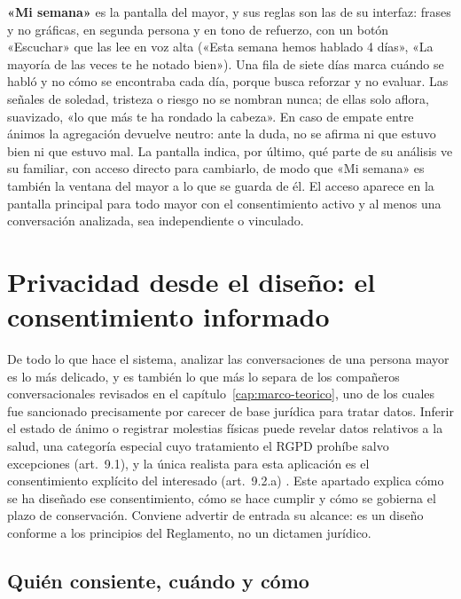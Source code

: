 \textbf{«Mi semana»} es la pantalla del mayor, y sus reglas son las de su interfaz: frases y no gráficas, en
segunda persona y en tono de refuerzo, con un botón «Escuchar» que las lee en voz alta («Esta semana hemos
hablado 4 días», «La mayoría de las veces te he notado bien»). Una fila de siete días marca cuándo se
habló y no cómo se encontraba cada día, porque busca reforzar y no evaluar. Las señales de soledad, tristeza
o riesgo no se nombran nunca; de ellas solo aflora, suavizado, «lo que más te ha rondado la cabeza». En caso
de empate entre ánimos la agregación devuelve neutro: ante la duda, no se afirma ni que estuvo bien ni que
estuvo mal. La pantalla indica, por último, qué parte de su análisis ve su familiar, con acceso directo para
cambiarlo, de modo que «Mi semana» es también la ventana del mayor a lo que se guarda de él. El acceso aparece
en la pantalla principal para todo mayor con el consentimiento activo y al menos una conversación analizada,
sea independiente o vinculado.

\section{Privacidad desde el diseño: el consentimiento informado}
\label{sec:privacidad}

De todo lo que hace el sistema, analizar las conversaciones de una persona mayor es lo más delicado, y es
también lo que más lo separa de los compañeros conversacionales revisados en el
capítulo~\ref{cap:marco-teorico}, uno de los cuales fue sancionado precisamente por carecer de base jurídica
para tratar datos. Inferir el estado de ánimo o registrar molestias físicas puede revelar datos relativos a
la salud, una categoría especial cuyo tratamiento el RGPD prohíbe salvo excepciones (art.~9.1), y la única
realista para esta aplicación es el consentimiento explícito del interesado (art.~9.2.a)
\citep{RGPD2016}. Este apartado explica cómo se ha diseñado ese consentimiento, cómo se hace cumplir y cómo
se gobierna el plazo de conservación. Conviene advertir de entrada su alcance: es un diseño conforme a los
principios del Reglamento, no un dictamen jurídico.

\subsection{Quién consiente, cuándo y cómo}

